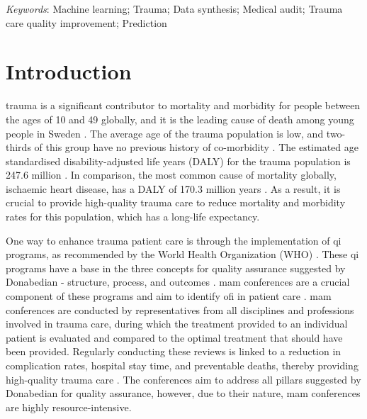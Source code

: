\documentclass[12pt, a4paper]{article}
\begin{document}
\textit{Keywords}: Machine learning; Trauma; Data synthesis; Medical audit; Trauma care quality improvement; Prediction

\newpage

\normalsize

\glsaddall
\printnoidxglossary[type=acronym,style=csuper]
\printnoidxglossary[style=gsuper]

\newpage
{}


\section{Introduction}
\Gls{trauma} is a significant contributor to mortality and morbidity for people between the ages of 10 and 49 globally, and it is the leading cause of death among young people in Sweden \cite{roth_global_2018, vos_global_2020, sos_death_2021}. The average age of the trauma population is low, and two-thirds of this group have no previous history of co-morbidity \cite{brattstrom_socio-economic_2015}. The estimated age standardised disability-adjusted life years (DALY) for the trauma population is 247.6 million \cite{haagsma_global_2016}. In comparison, the most common cause of mortality globally, ischaemic heart disease, has a DALY of 170.3 million years \cite{wang_global_2021,roth_global_2018}. As a result, it is crucial to provide high-quality trauma care to reduce mortality and morbidity rates for this population, which has a long-life expectancy.

One way to enhance trauma patient care is through the implementation of \acrfull{qi} programs, as recommended by the World Health Organization (WHO) \cite{world_health_organization_guidelines_2009}. These \acrshort{qi} programs have a base in the three concepts for quality assurance suggested by Donabedian - structure, process, and outcomes \cite{donabedian_effectiveness_1996}. \Acrfull{mam}  conferences are a crucial component of these programs and aim to identify \acrfull{ofi} in patient care \cite{santana_development_2014}. \acrshort{mam} conferences are conducted by representatives from all disciplines and professions involved in trauma care, during which the treatment provided to an individual patient is evaluated and compared to the optimal treatment that should have been provided. Regularly conducting these reviews is linked to a reduction in complication rates, hospital stay time, and preventable deaths, thereby providing high-quality trauma care \cite{stelfox_evidence_2011, mcdermott_trauma_1994}. The conferences aim to address all pillars suggested by Donabedian for quality assurance, however, due to their nature, \acrshort{mam} conferences are highly resource-intensive.
\end{document}
